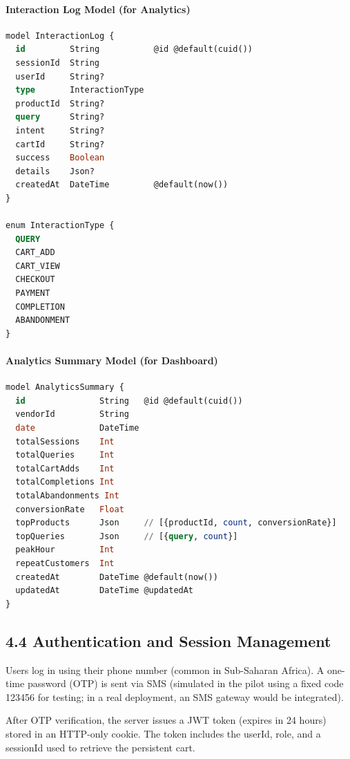 \documentclass[12pt,a4paper]{article}
\begin{document}
\paragraph{Interaction Log Model (for Analytics)}

\begin{lstlisting}[language=SQL, caption=Interaction Log Model Schema]
model InteractionLog {
  id         String           @id @default(cuid())
  sessionId  String
  userId     String?
  type       InteractionType
  productId  String?
  query      String?
  intent     String?
  cartId     String?
  success    Boolean
  details    Json?
  createdAt  DateTime         @default(now())
}

enum InteractionType {
  QUERY
  CART_ADD
  CART_VIEW
  CHECKOUT
  PAYMENT
  COMPLETION
  ABANDONMENT
}
\end{lstlisting}

\paragraph{Analytics Summary Model (for Dashboard)}

\begin{lstlisting}[language=SQL, caption=Analytics Summary Model Schema]
model AnalyticsSummary {
  id               String   @id @default(cuid())
  vendorId         String
  date             DateTime
  totalSessions    Int
  totalQueries     Int
  totalCartAdds    Int
  totalCompletions Int
  totalAbandonments Int
  conversionRate   Float
  topProducts      Json     // [{productId, count, conversionRate}]
  topQueries       Json     // [{query, count}]
  peakHour         Int
  repeatCustomers  Int
  createdAt        DateTime @default(now())
  updatedAt        DateTime @updatedAt
}
\end{lstlisting}

\subsection{4.4 Authentication and Session Management}

Users log in using their phone number (common in Sub-Saharan Africa). A one-time password (OTP) is sent via SMS (simulated in the pilot using a fixed code 123456 for testing; in a real deployment, an SMS gateway would be integrated).

After OTP verification, the server issues a JWT token (expires in 24 hours) stored in an HTTP-only cookie. The token includes the userId, role, and a sessionId used to retrieve the persistent cart.
\end{document}
